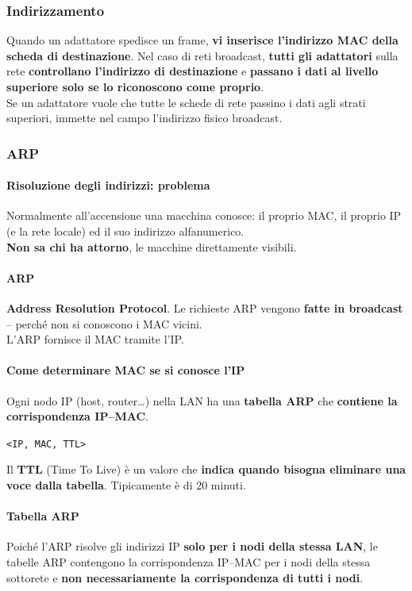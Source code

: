 \documentclass[10pt]{article}
\begin{document}
\subsubsection{Indirizzamento} Quando un adattatore spedisce un frame, \textbf{vi inserisce l'indirizzo MAC della scheda di destinazione}. Nel caso di reti broadcast, \textbf{tutti gli adattatori} sulla rete \textbf{controllano l'indirizzo di destinazione} e \textbf{passano i dati al livello superiore solo se lo riconoscono come proprio}.\\
Se un adattatore vuole che tutte le schede di rete passino i dati agli strati superiori, immette nel campo l'indirizzo fisico broadcast.
\subsubsection{ARP}
\paragraph{Risoluzione degli indirizzi: problema} Normalmente all'accensione una macchina conosce: il proprio MAC, il proprio IP (e la rete locale) ed il suo indirizzo alfanumerico.\\
\textbf{Non sa chi ha attorno}, le macchine direttamente visibili.
\paragraph{ARP} \textbf{Address Resolution Protocol}. Le richieste ARP vengono \textbf{fatte in broadcast} -- perché non si conoscono i MAC vicini.\\
L'ARP fornisce il MAC tramite l'IP.
\paragraph{Come determinare MAC se si conosce l'IP} Ogni nodo IP (host, router\ldots) nella LAN ha una \textbf{tabella ARP} che \textbf{contiene la corrispondenza IP--MAC}.
\begin{center}
\texttt{<IP, MAC, TTL>}
\end{center}
Il \textbf{TTL} (Time To Live) è un valore che \textbf{indica quando bisogna eliminare una  voce dalla tabella}. Tipicamente è di 20 minuti.
\paragraph{Tabella ARP} Poiché l'ARP risolve gli indirizzi IP \textbf{solo per i nodi della stessa LAN}, le tabelle ARP contengono la corrispondenza IP--MAC per i nodi della stessa sottorete e \textbf{non necessariamente la corrispondenza di tutti i nodi}.
\end{document}
